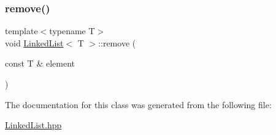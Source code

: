 \mbox{\label{class_linked_list_a464f248b57c763a253f9bba018d1a857}} 
\subsubsection{\texorpdfstring{remove()}{remove()}}
{\footnotesize\ttfamily template$<$typename T$>$ \\
void \mbox{\hyperlink{class_linked_list}{Linked\+List}}$<$ T $>$\+::remove (\begin{DoxyParamCaption}\item[{const T \&}]{element }\end{DoxyParamCaption})\hspace{0.3cm}{\ttfamily [inline]}}



The documentation for this class was generated from the following file\+:\begin{DoxyCompactItemize}
\item 
\mbox{\hyperlink{_linked_list_8hpp}{Linked\+List.\+hpp}}\end{DoxyCompactItemize}
